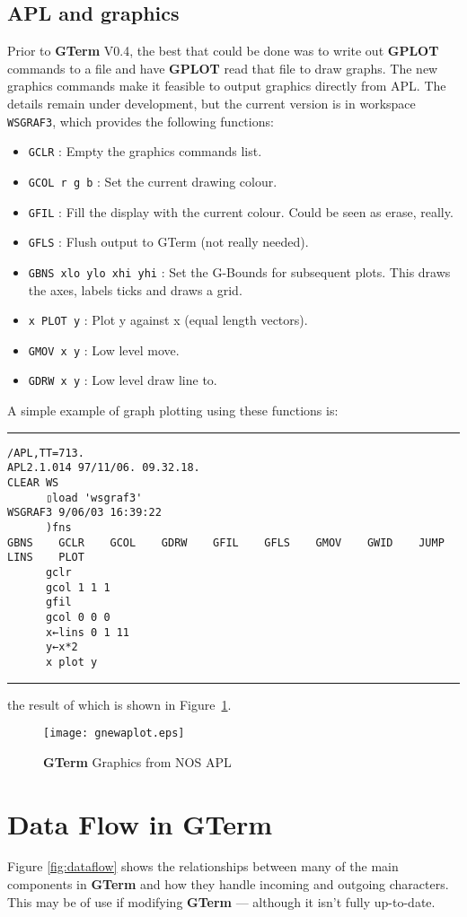 \documentclass[a4paper,twoside,11pt]{article}
\makeatletter
\def\maxwidth{%
  \ifdim\Gin@nat@width>\linewidth
    \linewidth
  \else
    \Gin@nat@width
  \fi
}
\newcommand{\newpara}{\par\vspace{4mm}\noindent}
\makeatother
\begin{document}
\subsection{APL and graphics}
Prior to \textbf{GTerm} V0.4, the best that could 
be done was to write out \textbf{GPLOT} commands to a file and have \textbf{GPLOT} read that
file to draw graphs. The new graphics commands make it feasible to output graphics directly from APL.
The details remain under development, but the current version is in workspace \texttt{WSGRAF3}, which provides
the following functions:

\begin{itemize}
\item \texttt{GCLR} : Empty the graphics commands list.
\item \texttt{GCOL r g b} : Set the current drawing colour.
\item \texttt{GFIL} : Fill the display with the current colour. Could be seen as erase, really.
\item \texttt{GFLS} : Flush output to GTerm (not really needed).
\item \texttt{GBNS xlo ylo xhi yhi} : Set the G-Bounds for subsequent plots. This draws the axes, labels ticks and draws a grid.
\item \texttt{x PLOT y} : Plot y against x (equal length vectors).
\item \texttt{GMOV x y} : Low level move.
\item \texttt{GDRW x y} : Low level draw line to.
\end{itemize}

\newpara
A simple example of graph plotting using these functions is:
\newpara
\hrule
{\scriptsize
\begin{verbatim}
/APL,TT=713.
APL2.1.014 97/11/06. 09.32.18.
CLEAR WS
      ▯load 'wsgraf3'
WSGRAF3 9/06/03 16:39:22
      )fns
GBNS    GCLR    GCOL    GDRW    GFIL    GFLS    GMOV    GWID    JUMP    LINS    PLOT
      gclr
      gcol 1 1 1
      gfil
      gcol 0 0 0
      x←lins 0 1 11
      y←x*2
      x plot y
\end{verbatim}
}
\hrule
\newpara
the result of which is shown in Figure~\ref{fig:graf2}.

\begin{figure}
	\centering
		\texttt{[image: gnewaplot.eps]}
	\caption{\textbf{GTerm} Graphics from NOS APL}
	\label{fig:graf2}
\end{figure}


\section{Data Flow in \textbf{GTerm}}
Figure \ref{fig:dataflow} shows the relationships between many of the
main components in \textbf{GTerm} and how they handle incoming and outgoing characters.
This may be of use if modifying \textbf{GTerm} --- although it isn't fully up-to-date.
\end{document}
